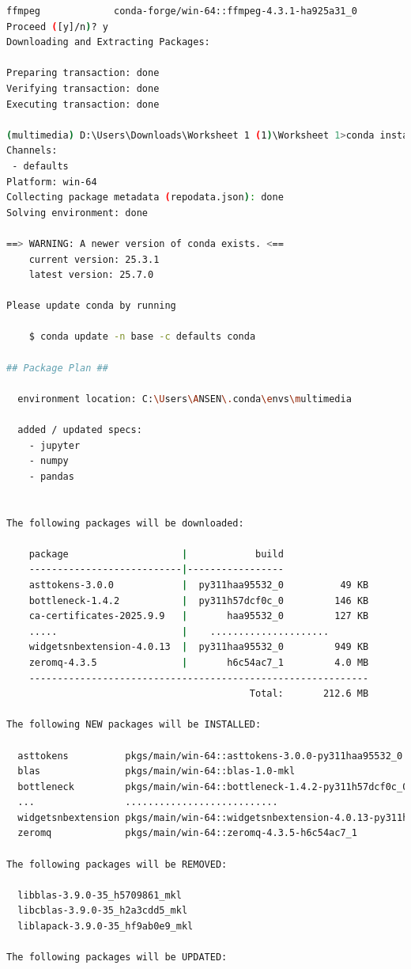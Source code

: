 \documentclass[11pt,a4paper]{article}
\begin{document}
\begin{itemize}
\begin{lstlisting}[language=bash, caption=Output instalansi library]
  ffmpeg             conda-forge/win-64::ffmpeg-4.3.1-ha925a31_0
Proceed ([y]/n)? y
Downloading and Extracting Packages:

Preparing transaction: done
Verifying transaction: done
Executing transaction: done

(multimedia) D:\Users\Downloads\Worksheet 1 (1)\Worksheet 1>conda install numpy pandas jupyter
Channels:
 - defaults
Platform: win-64
Collecting package metadata (repodata.json): done
Solving environment: done

==> WARNING: A newer version of conda exists. <==
    current version: 25.3.1
    latest version: 25.7.0

Please update conda by running

    $ conda update -n base -c defaults conda

## Package Plan ##

  environment location: C:\Users\ANSEN\.conda\envs\multimedia

  added / updated specs:
    - jupyter
    - numpy
    - pandas


The following packages will be downloaded:

    package                    |            build
    ---------------------------|-----------------
    asttokens-3.0.0            |  py311haa95532_0          49 KB
    bottleneck-1.4.2           |  py311h57dcf0c_0         146 KB
    ca-certificates-2025.9.9   |       haa95532_0         127 KB
    .....                      |    .....................
    widgetsnbextension-4.0.13  |  py311haa95532_0         949 KB
    zeromq-4.3.5               |       h6c54ac7_1         4.0 MB
    ------------------------------------------------------------
                                           Total:       212.6 MB

The following NEW packages will be INSTALLED:

  asttokens          pkgs/main/win-64::asttokens-3.0.0-py311haa95532_0
  blas               pkgs/main/win-64::blas-1.0-mkl
  bottleneck         pkgs/main/win-64::bottleneck-1.4.2-py311h57dcf0c_0
  ...                ...........................
  widgetsnbextension pkgs/main/win-64::widgetsnbextension-4.0.13-py311haa95532_0
  zeromq             pkgs/main/win-64::zeromq-4.3.5-h6c54ac7_1

The following packages will be REMOVED:

  libblas-3.9.0-35_h5709861_mkl
  libcblas-3.9.0-35_h2a3cdd5_mkl
  liblapack-3.9.0-35_hf9ab0e9_mkl

The following packages will be UPDATED:


\end{lstlisting}
\end{itemize}
\end{document}
